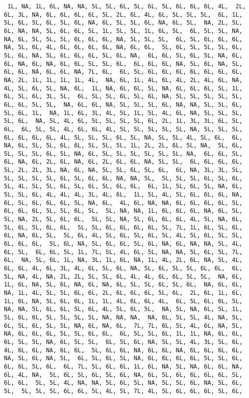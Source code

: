 \documentclass[
]{article}
\begin{document}
\begin{verbatim}
 1L, NA, 1L, 6L, NA, NA, 5L, 5L, 6L, 5L, 6L, 5L, 6L, 6L, 6L, 4L,  2L, 6L, 3L, NA, 6L, 6L, 6L, 6L, 5L, 2L, 6L, 4L, 6L, 5L, 5L, 5L,  6L, 1L, 5L, 6L, 5L, 6L, 5L, 6L, NA, 6L, 5L, 5L, 6L, NA, 6L, 5L,  NA, 2L, 5L, 6L, NA, NA, 5L, 6L, 6L, 5L, 1L, 5L, 5L, 1L, 6L, 5L,  6L, 5L, 5L, NA, NA, 6L, 5L, 5L, 5L, 6L, 6L, 6L, NA, 5L, 5L, 5L,  6L, 5L, 6L, 6L, 6L, NA, 5L, 6L, 4L, 6L, 6L, 6L, 6L, NA, 6L, 6L,  5L, 6L, 5L, 5L, 5L, 6L, 5L, 6L, NA, 5L, 6L, 6L, 6L, 5L, 6L, NA,  6L, 6L, 5L, 6L, 5L, NA, 6L, 6L, NA, 6L, NA, 6L, 6L, 5L, 5L, 6L,  6L, 6L, 6L, NA, 5L, 6L, NA, 5L, 6L, 6L, NA, 6L, 6L, NA, 7L, 6L,  6L, 5L, 6L, 6L, 6L, 6L, 6L, 6L, 6L, NA, 2L, 1L, 1L, 1L, 1L, 4L,  NA, 6L, 1L, 4L, 6L, 4L, 2L, 4L, 6L, NA, 4L, 5L, 6L, 5L, NA, 6L,  1L, NA, 6L, 6L, 5L, NA, 6L, 6L, 6L, 5L, 1L, 6L, 5L, 6L, 3L, 5L,  6L, 5L, 5L, 6L, 5L, 6L, NA, 5L, 5L, 5L, 5L, 5L, 6L, 6L, 5L, 5L,  NA, 6L, 6L, NA, 5L, 5L, 5L, 6L, NA, NA, 5L, 5L, 6L, 5L, 6L, 1L,  NA, 1L, 6L, 3L, 4L, 5L, 1L, 5L, 4L, 6L, NA, 5L, 5L, 5L, 5L, 6L,  NA, 5L, 4L, 6L, 5L, 5L, 5L, 5L, 6L, 2L, 1L, 3L, 3L, 6L, 5L, 6L,  6L, 5L, 5L, 4L, 6L, 6L, 4L, 5L, 5L, 5L, 5L, 5L, NA, 5L, 5L, 5L,  6L, 6L, 6L, 6L, 4L, 5L, 5L, 5L, 6L, 5L, NA, 5L, 5L, 4L, 5L, 6L,  6L, NA, 6L, 5L, 5L, 6L, 6L, 5L, 5L, 5L, 1L, 2L, 2L, 6L, 5L, NA,  5L, 6L, 5L, 5L, 5L, 6L, 5L, NA, 6L, 5L, 5L, 5L, 5L, 5L, 5L, NA,  6L, 6L, 5L, 6L, NA, 6L, 2L, 6L, NA, 6L, 2L, 6L, 6L, NA, 5L, 5L,  6L, 6L, 6L, 6L, 5L, 2L, 2L, 3L, NA, 6L, NA, 5L, 5L, 6L, 5L, 6L,  6L, NA, 3L, 3L, 5L, 5L, 5L, 5L, 5L, 6L, 5L, 6L, 6L, NA, NA, 5L,  5L, 5L, 5L, 6L, 5L, 6L, 5L, 4L, 5L, 5L, 6L, 5L, 6L, 5L, 6L, 6L,  6L, 1L, 5L, 6L, 5L, NA, 6L, 5L, 5L, 6L, 4L, 4L, 4L, 3L, 4L, 6L,  1L, 5L, 4L, 5L, 6L, 6L, 6L, NA, 6L, 5L, 6L, 6L, 6L, 5L, NA, 6L,  4L, 6L, NA, NA, 6L, 6L, 6L, 6L, 5L, 6L, 6L, 6L, 5L, 5L, 6L, 5L,  5L, NA, NA, 1L, 6L, 6L, 6L, NA, 6L, 5L, 5L, NA, 2L, 5L, 6L, 6L,  5L, 5L, NA, 5L, 6L, 6L, 6L, 4L, 5L, NA, 6L, 5L, 6L, 5L, 6L, 6L,  5L, 5L, 6L, 6L, 6L, 6L, 5L, 7L, 1L, 6L, 5L, 6L, 6L, NA, 6L, 5L,  5L, 6L, 4L, 5L, 6L, 5L, 6L, 5L, 4L, 5L, 6L, 5L, 5L, 6L, 6L, 6L,  5L, 6L, NA, 5L, 6L, 6L, 5L, 6L, NA, 6L, NA, NA, 5L, 4L, 6L, 5L,  6L, 6L, 5L, 1L, 7L, 5L, 4L, 6L, 5L, NA, NA, 5L, 6L, 5L, 7L, 6L,  NA, 5L, 6L, 1L, NA, 3L, 1L, 6L, NA, 1L, 4L, 2L, 6L, NA, 5L, 4L,  6L, 6L, 4L, 6L, 3L, 4L, 6L, 5L, 6L, NA, 5L, 6L, 5L, 5L, 6L, 6L,  6L, 5L, NA, 4L, NA, 2L, 2L, 5L, 5L, 6L, 4L, 4L, 6L, 6L, 5L, 5L,  NA, 6L, 1L, 6L, NA, 5L, 6L, NA, 6L, NA, 6L, 5L, 5L, 6L, 5L, 6L,  NA, 6L, 6L, NA, 1L, 4L, 5L, 5L, 6L, 6L, 2L, 6L, 6L, 6L, 5L, 6L,  2L, 6L, 1L, 6L, 1L, 6L, NA, 5L, 6L, 6L, 1L, 1L, 4L, 6L, 6L, 4L,  6L, 5L, 6L, 6L, 5L, NA, NA, 5L, 6L, 6L, 5L, 6L, 4L, 5L, 6L, 5L,  NA, 5L, NA, 6L, 5L, 1L, 5L, 6L, 6L, 5L, 5L, 5L, 5L, NA, NA, NA,  NA, 6L, 5L, 5L, 4L, NA, 5L, 6L, 5L, 6L, 5L, 5L, NA, 6L, NA, 6L,  7L, 7L, 6L, 5L, 4L, 6L, NA, 5L, NA, 6L, 6L, 6L, 5L, 5L, 6L, 6L,  6L, 5L, 5L, 6L, 1L, 1L, NA, 6L, 6L, 6L, 5L, 5L, NA, 6L, 5L, 5L,  6L, 5L, 6L, NA, 5L, 5L, 4L, 3L, 5L, 6L, 4L, 6L, 6L, NA, 6L, 6L,  5L, 6L, 6L, NA, 6L, 6L, NA, 6L, 6L, 6L, 6L, NA, 5L, 6L, NA, 5L,  6L, 5L, 6L, 5L, NA, 6L, 6L, 6L, 6L, 5L, 5L, 6L, 6L, 6L, 5L, 6L,  6L, 7L, 5L, 6L, 6L, 1L, 6L, NA, 5L, NA, 6L, 6L, NA, 6L, 4L, NA,  5L, 6L, 5L, 6L, 5L, 6L, NA, 6L, 5L, 6L, 6L, 6L, 6L, 5L, 6L, 6L,  5L, 5L, 4L, NA, NA, 5L, 6L, 5L, NA, 5L, 5L, 6L, NA, 5L, 6L, 5L,  5L, 5L, 5L, 6L, 6L, 5L, 4L, 5L, 7L, 4L, 5L, 6L, 6L, 6L, 5L, 6L,  
\end{verbatim}
\end{document}
